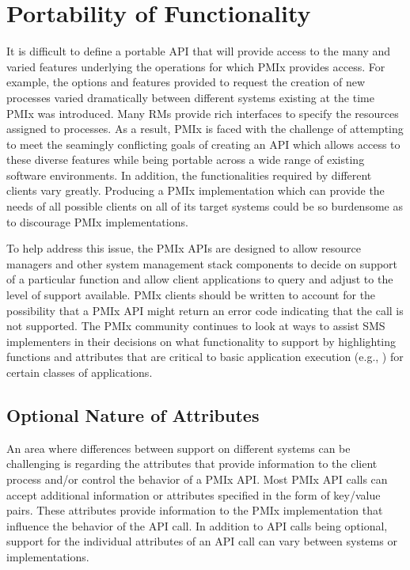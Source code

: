\section{Portability of Functionality}
\label{chap:intro:not_supported}

It is difficult to define a portable \ac{API} that will provide access to the many
and varied features underlying the operations for which \ac{PMIx} provides access.
For example, the options and features provided to request the creation
of new processes varied dramatically between different systems existing
at the time \ac{PMIx} was introduced.  Many \acp{RM} provide rich interfaces
to specify the resources assigned to processes.
As a result, \ac{PMIx} is faced with the challenge
of attempting to meet the seamingly conflicting goals of creating an \ac{API} which allows
access to these diverse features while being portable across a wide range of
existing software environments. In addition, the functionalities required by different
clients vary greatly.  Producing a \ac{PMIx} implementation
which can provide the needs of all possible clients on all of its target systems
could be so burdensome as to discourage \ac{PMIx} implementations.

To help address this issue, the \ac{PMIx} \acp{API} are designed to allow resource managers
and other system management stack components to decide on support of a
particular function and allow client applications to query and adjust to the level of support available.  \ac{PMIx} clients should be written to account for the possibility that a \ac{PMIx} \ac{API} might return an error code indicating that the call is not supported.
The \ac{PMIx} community continues to look at ways to assist \ac{SMS} implementers in their decisions
on what functionality to support by highlighting functions and attributes that are
critical to basic application execution (e.g., ) for certain classes of applications.

\subsection{Optional Nature of Attributes}

An area where differences between support on different systems can be challenging is regarding the attributes that provide information to the client process and/or control the behavior of a \ac{PMIx} \ac{API}.  Most
\ac{PMIx} \ac{API} calls can accept additional information or attributes specified in the form of
key/value pairs. These attributes provide information to the \ac{PMIx} implementation that influence the
behavior of the \ac{API} call.  In addition to \ac{API} calls being optional, support for the
individual attributes of an \ac{API} call can vary between systems or implementations.

